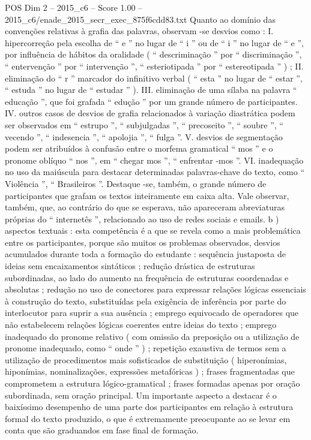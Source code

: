 \begin{textsample}{POS Dim 2 – 2015\_c6 – Score 1.00 – 2015\_c6/enade\_2015\_secr\_exec\_875f6cdd83.txt}
Quanto ao domínio das convenções relativas à grafia das palavras, observam -se desvios como : I. hipercorreção pela escolha de “ e ” no lugar de “ i ” ou de “ i ” no lugar de “ e ”, por influência de hábitos da oralidade ( “ descriminação ” por “ discriminação ”, “ entervenção ” por “ intervenção ”, “ esteriotipada ” por “ estereotipada ” ) ; II. eliminação do “ r ” marcador do infinitivo verbal ( “ esta ” no lugar de “ estar ”, “ estuda ” no lugar de “ estudar ” ).
III. eliminação de uma sílaba na palavra “ educação ”, que foi grafada “ edução ” por um grande número de participantes.
IV. outros casos de desvios de grafia relacionados à variação diastrática podem ser observados em “ estrupo ”, “ subjulgadas ”, “ precoseito ”, “ soubre ”, “ vecendo ”, “ indesencia ”, “ apolojia ”, “ fulga ”.
V. desvios de segmentação podem ser atribuídos à confusão entre o morfema gramatical “ mos ” e o pronome oblíquo “ nos ”, em “ chegar mos ”, “ enfrentar -mos ”.
VI. inadequação no uso da maiúscula para destacar determinadas palavras-chave do texto, como “ Violência ”, “ Brasileiros ”.
Destaque -se, também, o grande número de participantes que grafam os textos inteiramente em caixa alta.
Vale observar, também, que, ao contrário do que se esperava, não apareceram abreviaturas próprias do “ internetês ”, relacionado ao uso de redes sociais e emails. b ) aspectos textuais : esta competência é a que se revela como a mais problemática entre os participantes, porque são muitos os problemas observados, desvios acumulados durante toda a formação do estudante : sequência justaposta de ideias sem encaixamentos sintáticos ; redução drástica de estruturas subordinadas, ao lado do aumento na frequência de estruturas coordenadas e absolutas ; redução no uso de conectores para expressar relações lógicas essenciais à construção do texto, substituídas pela exigência de inferência por parte do interlocutor para suprir a sua ausência ; emprego equivocado de operadores que não estabelecem relações lógicas coerentes entre ideias do texto ; emprego inadequado do pronome relativo ( com omissão da preposição ou a utilização de pronome inadequado, como “ onde ” ) ; repetição exaustiva de termos sem a utilização de procedimentos mais sofisticados de substituição ( hiperonímias, hiponímias, nominalizações, expressões metafóricas ) ; frases fragmentadas que comprometem a estrutura lógico-gramatical ; frases formadas apenas por oração subordinada, sem oração principal.
Um importante aspecto a destacar é o baixíssimo desempenho de uma parte dos participantes em relação à estrutura formal do texto produzido, o que é extremamente preocupante ao se levar em conta que são graduandos em fase final de formação.

\end{textsample}
